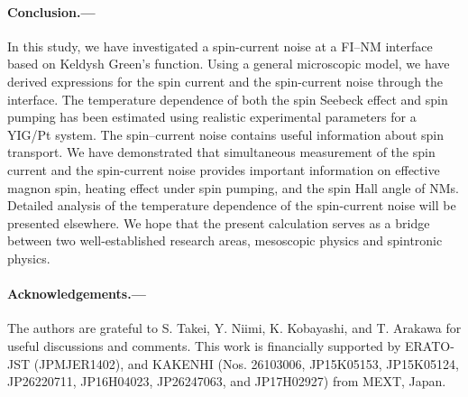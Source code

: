 \documentclass[aps,prl,reprint,showpacs]{revtex4-1}
\begin{document}
\paragraph{Conclusion.---} 
In this study, we have investigated a spin-current noise at a FI--NM interface based on Keldysh Green's function. 
Using a general microscopic model, we have derived expressions for the spin current and the spin-current noise through the interface. 
The temperature dependence of both the spin Seebeck effect and spin pumping has been estimated using realistic experimental parameters for a YIG/Pt system. 
The spin--current noise contains useful information about spin transport.
We have demonstrated that simultaneous measurement of the spin current and the spin-current noise provides important information on effective magnon spin, heating effect under spin pumping, and the spin Hall angle of NMs.
Detailed analysis of the temperature dependence of the spin-current noise will be presented elsewhere.
We hope that the present calculation serves as a bridge between two well-established research areas, mesoscopic physics and spintronic physics.

\paragraph{Acknowledgements.---}
The authors are grateful to S. Takei, Y. Niimi, K. Kobayashi, and T. Arakawa for useful discussions and comments. 
This work is financially supported by ERATO-JST (JPMJER1402), and KAKENHI (Nos. 26103006, JP15K05153, JP15K05124, JP26220711, JP16H04023, JP26247063, and JP17H02927) from MEXT, Japan.
\end{document}
